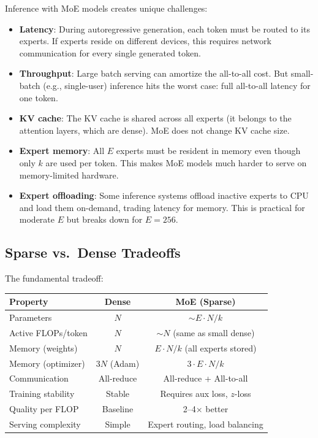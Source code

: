 Inference with MoE models creates unique challenges:
\begin{itemize}
  \item \textbf{Latency}: During autoregressive generation, each token must be routed to its experts. If experts reside on different devices, this requires network communication for every single generated token.
  \item \textbf{Throughput}: Large batch serving can amortize the all-to-all cost. But small-batch (e.g., single-user) inference hits the worst case: full all-to-all latency for one token.
  \item \textbf{KV cache}: The KV cache is shared across all experts (it belongs to the attention layers, which are dense). MoE does not change KV cache size.
  \item \textbf{Expert memory}: All $E$ experts must be resident in memory even though only $k$ are used per token. This makes MoE models much harder to serve on memory-limited hardware.
  \item \textbf{Expert offloading}: Some inference systems offload inactive experts to CPU and load them on-demand, trading latency for memory. This is practical for moderate $E$ but breaks down for $E = 256$.
\end{itemize}

\subsection{Sparse vs.\ Dense Tradeoffs}

The fundamental tradeoff:
\begin{center}
\renewcommand{\arraystretch}{1.3}
\begin{tabular}{lcc}
\toprule
\textbf{Property} & \textbf{Dense} & \textbf{MoE (Sparse)} \\
\midrule
Parameters & $N$ & $\sim E \cdot N / k$ \\
Active FLOPs/token & $N$ & $\sim N$ (same as small dense) \\
Memory (weights) & $N$ & $E \cdot N / k$ (all experts stored) \\
Memory (optimizer) & $3N$ (Adam) & $3 \cdot E \cdot N / k$ \\
Communication & All-reduce & All-reduce + All-to-all \\
Training stability & Stable & Requires aux loss, $z$-loss \\
Quality per FLOP & Baseline & 2--4$\times$ better \\
Serving complexity & Simple & Expert routing, load balancing \\
\bottomrule
\end{tabular}
\end{center}

